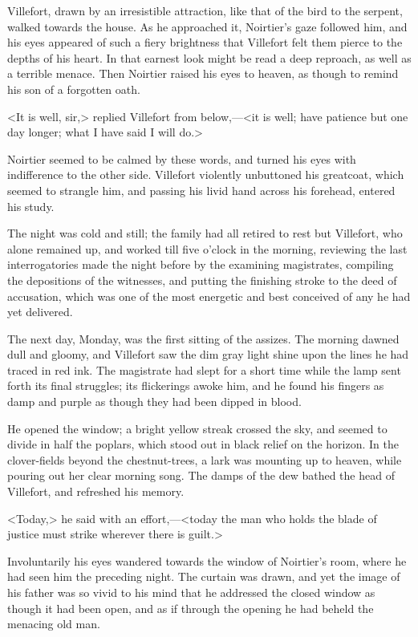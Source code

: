  Villefort, drawn by an irresistible attraction, like that of the bird to the serpent, walked towards the house. As he approached it, Noirtier's gaze followed him, and his eyes appeared of such a fiery brightness that Villefort felt them pierce to the depths of his heart. In that earnest look might be read a deep reproach, as well as a terrible menace. Then Noirtier raised his eyes to heaven, as though to remind his son of a forgotten oath. 

 <It is well, sir,> replied Villefort from below,—<it is well; have patience but one day longer; what I have said I will do.> 

 Noirtier seemed to be calmed by these words, and turned his eyes with indifference to the other side. Villefort violently unbuttoned his greatcoat, which seemed to strangle him, and passing his livid hand across his forehead, entered his study. 

 The night was cold and still; the family had all retired to rest but Villefort, who alone remained up, and worked till five o'clock in the morning, reviewing the last interrogatories made the night before by the examining magistrates, compiling the depositions of the witnesses, and putting the finishing stroke to the deed of accusation, which was one of the most energetic and best conceived of any he had yet delivered. 

 The next day, Monday, was the first sitting of the assizes. The morning dawned dull and gloomy, and Villefort saw the dim gray light shine upon the lines he had traced in red ink. The magistrate had slept for a short time while the lamp sent forth its final struggles; its flickerings awoke him, and he found his fingers as damp and purple as though they had been dipped in blood. 

 He opened the window; a bright yellow streak crossed the sky, and seemed to divide in half the poplars, which stood out in black relief on the horizon. In the clover-fields beyond the chestnut-trees, a lark was mounting up to heaven, while pouring out her clear morning song. The damps of the dew bathed the head of Villefort, and refreshed his memory. 

 <Today,> he said with an effort,—<today the man who holds the blade of justice must strike wherever there is guilt.> 

 Involuntarily his eyes wandered towards the window of Noirtier's room, where he had seen him the preceding night. The curtain was drawn, and yet the image of his father was so vivid to his mind that he addressed the closed window as though it had been open, and as if through the opening he had beheld the menacing old man. 


